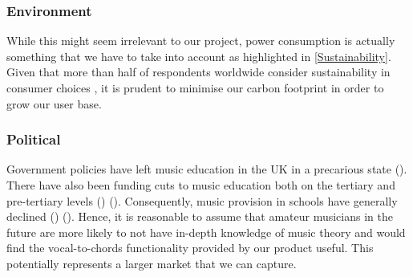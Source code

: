 \subsubsection{Environment}
While this might seem irrelevant to our project, power consumption is actually something that we have to take into account as highlighted in \cref{Sustainability}. Given that more than half of respondents worldwide consider sustainability in consumer choices \cite{GlobalSurvey}, it is prudent to minimise our carbon footprint in order to grow our user base.

\subsubsection{Political}
Government policies have left music education in the UK in a precarious state (\cite{perilousstate}). There have also been funding cuts to music education both on the tertiary and pre-tertiary levels (\cite{weale2021}) (\cite{macdonald2021}). Consequently, music provision in schools have generally declined (\cite{brown2018}) (\cite{weale2018}). Hence, it is reasonable to assume that amateur musicians in the future are more likely to not have in-depth knowledge of music theory and would find the vocal-to-chords functionality provided by our product useful. This potentially represents a larger market that we can capture.

